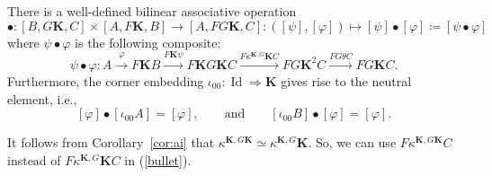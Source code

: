\documentclass[10pt]{simplearticle}
\newcommand{\Id}{\operatorname{Id}}
\newcommand{\fK}{\mathbf{K}}
\begin{document}
\begin{prop}\label{prop:bullet-bilin-assoc}
There is a well-defined bilinear associative
operation
\[
\bullet\colon[B,G\fK,C]\times[A,F\fK,B]\to[A,FG\fK,C]\colon([\psi],[\varphi])\mapsto[\psi]\bullet[\varphi]\coloneqq[\psi\bullet\varphi]
\]
where $\psi\bullet\varphi$ is the following composite:
\begin{equation}
\psi\bullet\varphi\colon A\xrightarrow{\varphi}F\fK B\xrightarrow{F\fK\psi}F\fK G\fK C\xrightarrow{F\kappa^{\fK,G}\fK C}FG\fK^{2}C\xrightarrow{FG\theta C}FG\fK C.\label{bullet}
\end{equation}
Furthermore, the corner embedding $\iota_{00}\colon\Id\Rightarrow\fK$
gives rise to the neutral element, i.e.,
\[
[\varphi]\bullet[\iota_{00}A]=[\varphi],\qquad\textrm{and}\qquad[\iota_{00}B]\bullet[\varphi]=[\varphi].
\]
\end{prop}

\begin{rem}\label{rem:57}
It follows from Corollary~\ref{cor:ai} that $\kappa^{\fK,G\fK}\simeq\kappa^{\fK,G}\fK$.
So, we can use $F\kappa^{\fK,G\fK}C$ instead of $F\kappa^{\fK,G}\fK C$
in (\ref{bullet}).
\end{rem}
\end{document}
